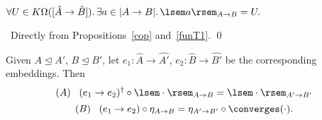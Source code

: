 \begin{proposition}[T5] 
$\forall U \in K\Omega ([\hat{A} \rightarrow \hat{B}]). \, \exists a \in |A \rightarrow B|. \, \lsem a \rsem_{A \rightarrow B} = U.$ 
\end{proposition}

\proof\ Directly from Propositions~\ref{cop} and~\ref{funT1}. \qed

\begin{proposition}[T6]
Given $A \trianglelefteq A'$, $B \trianglelefteq B'$, let $e_{1} : \hat{A} \rightarrow \hat{A'}$, $e_{2} : \hat{B} \rightarrow \hat{B'}$ be the corresponding embeddings. Then
\[ (A) \;\;\; (e_{1} \rightarrow e_{2})^{\dag} \circ \lsem \cdot \rsem_{A \rightarrow B} = \lsem \cdot \rsem_{A' \rightarrow B'} \]
\[ (B) \;\;\; (e_{1} \rightarrow e_{2}) \circ \eta_{A \rightarrow B} =  \eta_{A' \rightarrow B'} \circ \converges (\cdot ). \]
\end{proposition}

